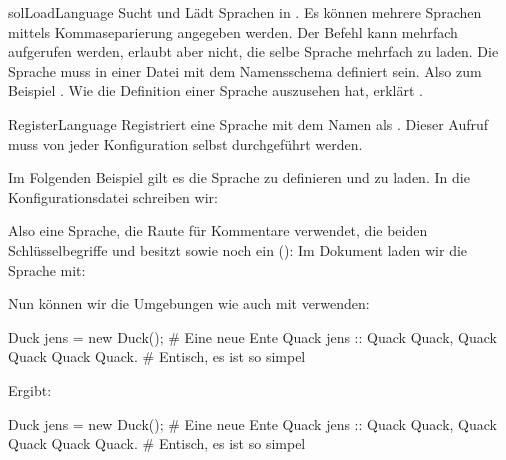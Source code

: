 \documentclass{sopra-base}
\begin{document}
\begin{command}{solLoadLanguage}{}
    Sucht und Lädt Sprachen in . Es können mehrere Sprachen mittels Kommaseparierung angegeben werden. Der Befehl kann mehrfach aufgerufen werden, erlaubt aber nicht, die selbe Sprache mehrfach zu laden. Die Sprache muss in einer Datei mit dem Namensschema  definiert sein. Also zum Beispiel . Wie die Definition einer Sprache auszusehen hat, erklärt . 
\end{command}

\begin{command}{RegisterLanguage}{}
    Registriert eine Sprache mit dem Namen  als . Dieser Aufruf muss von jeder Konfiguration selbst durchgeführt werden. \par{}
    Im Folgenden Beispiel gilt es die Sprache  zu definieren und zu laden. In die Konfigurationsdatei schreiben wir:
\begin{latex}
\end{latex}
    Also eine Sprache, die Raute für Kommentare verwendet, die beiden Schlüsselbegriffe  und  besitzt sowie noch ein  (): 
    Im Dokument laden wir die Sprache mit:
\begin{latex}
\end{latex}
    Nun können wir die Umgebungen wie  auch mit  verwenden:
\begin{latex}[morekeywords={[3]{rubberduck}}]
\begin{rubberduck}
Duck jens = new Duck(); # Eine neue Ente
Quack jens ::{
    Quack Quack, Quack Quack
    Quack Quack. # Entisch, es ist so simpel
}
\end{rubberduck}
\end{latex}
Ergibt:
\begin{rubberduck}
Duck jens = new Duck(); # Eine neue Ente
Quack jens ::{
    Quack Quack, Quack Quack
    Quack Quack. # Entisch, es ist so simpel
}
\end{rubberduck}
\end{command}
\end{document}
